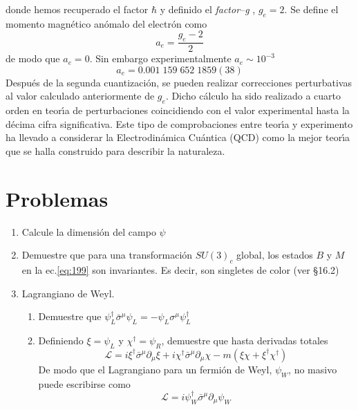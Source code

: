 donde hemos recuperado el factor $\hbar$ y definido el \emph{factor--g} \cite{spin},  $g_e=2$. Se define el momento magn\'etico an\'omalo del electr\'on como
\begin{equation}
  a_e=\frac{g_e-2}{2}
\end{equation}
de modo que $a_e=0$. Sin embargo experimentalmente $a_e\sim10^{-3}$
\begin{equation}
  a_e=0.001\;159\;652\;1859(38)
\end{equation}
Despu\'es de la segunda cuantizaci\'on, se pueden realizar correcciones perturbativas al valor calculado anteriormente de $g_e$. Dicho c\'alculo ha sido realizado a cuarto orden en teor\'\i a de perturbaciones coincidiendo con el valor experimental hasta la d\'ecima cifra significativa. Este tipo de comprobaciones entre teor\'\i a y experimento ha llevado a considerar la Electrodin\'amica Cu\'antica (QCD) como la mejor teor\'\i a que se halla construido para describir la naturaleza. 




\section{Problemas}
\label{sec:problemas}
\begin{enumerate}%
\item Calcule la dimensi\'on del campo $\psi$
\label{item:problemas5-1} %
\item Demuestre que para una transformaci\'on $SU(3)_c$ global, los estados $B$ y $M$ en la ec.\eqref{eq:199} son invariantes. Es decir, son singletes de color (ver \cite{cottingham} \S16.2)
\label{item:problemas5-2} %
\item Lagrangiano de Weyl.
  \begin{enumerate}
  \item Demuestre que $\psi_L^\dagger\bar{\sigma}^\mu\psi_L =-\psi_L\sigma^\mu\psi_L^\dagger$
  \item Definiendo $\xi=\psi_L$ y $\chi^\dagger=\psi_R$, demuestre que hasta derivadas totales
    \begin{equation}
      \mathcal{L}=i\xi^\dagger\bar{\sigma}^\mu\partial_\mu\xi+i\chi^\dagger\bar{\sigma}^\mu\partial_\mu\chi-m(\xi\chi+\xi^\dagger\chi^\dagger)
    \end{equation}
De modo que el Lagrangiano para un fermi\'on de Weyl, $\psi_W$, no masivo puede escribirse como
\begin{equation}
  \mathcal{L}=i\psi_W^\dagger\bar{\sigma}^\mu\partial_\mu\psi_W
\end{equation}
  \end{enumerate}
\label{item:problemas5-3}
\end{enumerate}%

